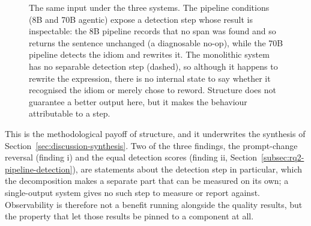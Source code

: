\begin{figure}[h!]
\centering
{}
\caption{The same input under the three systems. The pipeline conditions (8B and 70B agentic) expose a detection step whose result is inspectable: the 8B pipeline records that no span was found and so returns the sentence unchanged (a diagnosable no-op), while the 70B pipeline detects the idiom and rewrites it. The monolithic system has no separable detection step (dashed), so although it happens to rewrite the expression, there is no internal state to say whether it recognised the idiom or merely chose to reword. Structure does not guarantee a better output here, but it makes the behaviour attributable to a step.}
\label{fig:poison-pill}
\end{figure}

This is the methodological payoff of structure, and it underwrites the synthesis of Section~\ref{sec:discussion-synthesis}. Two of the three findings, the prompt-change reversal (finding i) and the equal detection scores (finding ii, Section~\ref{subsec:rq2-pipeline-detection}), are statements about the detection step in particular, which the decomposition makes a separate part that can be measured on its own; a single-output system gives no such step to measure or report against. Observability is therefore not a benefit running alongside the quality results, but the property that let those results be pinned to a component at all.

